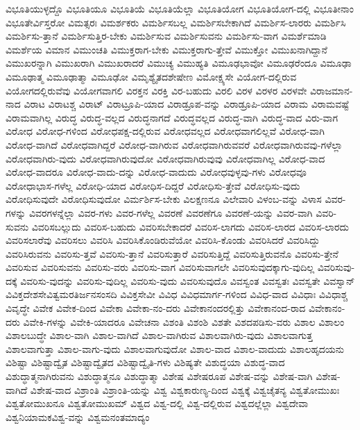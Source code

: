 {ವಿಭೂತಿಯುಳ್ಳದ್ದೊ
ವಿಭೂತಿಯೂ
ವಿಭೂತಿಯೆ
ವಿಭೂತಿಯೆಲ್ಲಾ
ವಿಭೂತಿಯೋಗ
ವಿಭೂತಿಯೋಗ-ದಲ್ಲಿ
ವಿಭೂತೀನಾಂ
ವಿಭೂತೇರ್ವಿಸ್ತರೋ
ವಿಮತ್ಸರಃ
ವಿಮರ್ಶಕರು
ವಿಮರ್ಶಿಸಬಲ್ಲ
ವಿಮರ್ಶಿಸಬೇಕಾಗಿದೆ
ವಿಮರ್ಶಿಸ-ಲಾರರು
ವಿಮರ್ಶಿಸಿ
ವಿಮರ್ಶಿಸು-ತ್ತಾನೆ
ವಿಮರ್ಶಿಸುತ್ತಿರ-ಬೇಕು
ವಿಮರ್ಶಿಸುವ
ವಿಮರ್ಶಿಸುವನು
ವಿಮರ್ಶಿಸು-ವಾಗ
ವಿಮರ್ಶೆಮಾಡಿ
ವಿಮರ್ಶೆಯ
ವಿಮಾನ
ವಿಮುಂಚತಿ
ವಿಮುಕ್ತರಾಗ-ಬೇಕು
ವಿಮುಕ್ತರಾಗು-ತ್ತೇವೆ
ವಿಮುಕ್ತೋ
ವಿಮುಖನಾಗಿದ್ದಾನೆ
ವಿಮುಖರನ್ನಾಗಿ
ವಿಮುಖರಾಗಿ
ವಿಮುಖರಾದರೆ
ವಿಮುಚ್ಯ
ವಿಮುಹ್ಯತಿ
ವಿಮೂಢಭಾವೋ
ವಿಮೂಢರೆಂದೂ
ವಿಮೂಢಾ
ವಿಮೂಢಾತ್ಮ
ವಿಮೂಢಾತ್ಮಾ
ವಿಮೂಢೋ
ವಿಮೃಶ್ಯೈತದಶೇಷೇಣ
ವಿಮೋಕ್ಷ್ಯಸೇ
ವಿಯೋಗ-ದಲ್ಲಿರುವ
ವಿಯೋಗದಲ್ಲಿರುವೆವು
ವಿಯೋಗವಾಗಲಿ
ವಿರಕ್ತನ
ವಿರಕ್ತಿ
ವಿರ-ಬಹುದು
ವಿರಲಿ
ವಿರಳ
ವಿರಳರ
ವಿರಳವೇ
ವಿರಾಜಮಾನ-ನಾದ
ವಿರಾಟ
ವಿರಾಟಶ್ಚ
ವಿರಾಟ್
ವಿರಾಟ್ರೂಪಿ-ಯಾದ
ವಿರಾಡ್ರೂಪ-ವನ್ನು
ವಿರಾಡ್ರೂಪಿ-ಯಾದ
ವಿರಾಮ
ವಿರಾಮವಷ್ಟೆ
ವಿರಾಮವಾಗಿಲ್ಲ
ವಿರುದ್ಧ
ವಿರುದ್ಧ-ವಲ್ಲದ
ವಿರುದ್ಧನಾಗದೆ
ವಿರುದ್ಧವಲ್ಲದ
ವಿರುದ್ಧ-ವಾಗಿ
ವಿರುದ್ಧ-ವಾದ
ವಿರು-ವಾಗ
ವಿರೋಧ
ವಿರೋಧ-ಗಳಿಂದ
ವಿರೋಧಪಕ್ಷ-ದಲ್ಲಿರುವ
ವಿರೋಧವಲ್ಲದ
ವಿರೋಧವಾಗಲಿಲ್ಲವೆ
ವಿರೋಧ-ವಾಗಿ
ವಿರೋಧ-ವಾಗಿದೆ
ವಿರೋಧವಾಗಿದ್ದರೆ
ವಿರೋಧ-ವಾಗಿರುವ
ವಿರೋಧವಾಗಿರುವವರೆ
ವಿರೋಧವಾಗಿರುವವು-ಗಳೆಲ್ಲಾ
ವಿರೋಧವಾಗಿರು-ವುದು
ವಿರೋಧವಾಗಿರುವುದೋ
ವಿರೋಧವಾಗಿರುವುವು
ವಿರೋಧವಾಗಿಲ್ಲ
ವಿರೋಧ-ವಾದ
ವಿರೋಧ-ವಾದರೂ
ವಿರೋಧ-ವಾದು-ದನ್ನು
ವಿರೋಧ-ವಾದುದು
ವಿರೋಧವುಳ್ಳವು-ಗಳು
ವಿರೋಧವೂ
ವಿರೋಧಾಭಾಸ-ಗಳೆಲ್ಲ
ವಿರೋಧಿ-ಯಾದ
ವಿರೋಧಿಸ-ದಿದ್ದರೆ
ವಿರೋಧಿಸು-ತ್ತೇವೆ
ವಿರೋಧಿಸು-ವುದು
ವಿರೋಧಿಸುವುದೇ
ವಿರೋಧಿಸುವುದೋ
ವಿರ್ಮರ್ಶಿಸ-ಬೇಕು
ವಿಲಕ್ಷಣನೂ
ವಿಲೇವಾರಿ
ವಿಳಂಬ-ವನ್ನು
ವಿಳಾಸ
ವಿವರ-ಗಳನ್ನು
ವಿವರಗಳನ್ನೆಲ್ಲಾ
ವಿವರ-ಗಳು
ವಿವರ-ಗಳೆಲ್ಲ
ವಿವರಣೆ
ವಿವರಣೆಗೂ
ವಿವರಣೆ-ಯನ್ನು
ವಿವರ-ವಾಗಿ
ವಿವರಿ-ಸುವನು
ವಿವರಿಸಬಲ್ಲುದು
ವಿವರಿಸ-ಬಹುದು
ವಿವರಿಸಬೇಕಾದರೆ
ವಿವರಿಸ-ಲಾಗದು
ವಿವರಿಸ-ಲಾರದ
ವಿವರಿಸ-ಲಾರದು
ವಿವರಿಸಲಾರೆವು
ವಿವರಿಸಲು
ವಿವರಿಸಿ
ವಿವರಿಸಿಕೊಂಡಿರುವೆಯೋ
ವಿವರಿಸಿ-ಕೊಂಡು
ವಿವರಿಸಿದರೆ
ವಿವರಿಸಿದ್ದು
ವಿವರಿಸಿರುವನು
ವಿವರಿಸು-ತ್ತವೆ
ವಿವರಿಸು-ತ್ತಾನೆ
ವಿವರಿಸುತ್ತಾರೆ
ವಿವರಿಸುತ್ತಿದ್ದೆ
ವಿವರಿಸುತ್ತಿರುವನೊ
ವಿವರಿಸು-ತ್ತೇನೆ
ವಿವರಿಸುವ
ವಿವರಿಸುವನು
ವಿವರಿಸು-ವರು
ವಿವರಿಸು-ವಾಗ
ವಿವರಿಸುವಾಗಲೇ
ವಿವರಿಸುವುದಕ್ಕಾಗು-ವುದಿಲ್ಲ
ವಿವರಿಸುವು-ದಕ್ಕೆ
ವಿವರಿಸು-ವುದನ್ನು
ವಿವರಿಸು-ವುದಿಲ್ಲ
ವಿವರಿಸು-ವುದು
ವಿವರಿಸುವುದೊ
ವಿವಸ್ವಂತ
ವಿವಸ್ವತಃ
ವಿವಸ್ವತೇ
ವಿವಸ್ವಾನ್
ವಿವಿಕ್ತದೇಶಸೇವಿತ್ವಮರತಿರ್ಜನಸಂಸದಿ
ವಿವಿಕ್ತಸೇವೀ
ವಿವಿಧ
ವಿವಿಧಮಾರ್ಗ-ಗಳಿಂದ
ವಿವಿಧ-ವಾದ
ವಿವಿಧಾಃ
ವಿವಿಧಾಶ್ಚ
ವಿವೃದ್ಧೇ
ವಿವೇಕ
ವಿವೇಕ-ದಿಂದ
ವಿವೇಕಾ
ವಿವೇಕಾ-ನಂ-ದರು
ವಿವೇಕಾನಂದರಲ್ಲಿತ್ತು
ವಿವೇಕಾನಂದ-ರಾದ
ವಿವೇಕಾನಂ-ದರು
ವಿವೇಕಿ-ಗಳನ್ನು
ವಿವೇಕಿ-ಯಾದರೂ
ವಿವೇಚನಾ
ವಿಶಂತಿ
ವಿಶಂಶಿ
ವಿಶತೇ
ವಿಶದಪಡಿಸು-ವರು
ವಿಶಾಲ
ವಿಶಾಲಂ
ವಿಶಾಲಬುದ್ಧೇ
ವಿಶಾಲ-ವಾಗಿ
ವಿಶಾಲ-ವಾಗಿದೆ
ವಿಶಾಲ-ವಾಗಿರುವ
ವಿಶಾಲವಾಗಿರು-ವುದು
ವಿಶಾಲವಾಗುತ್ತ
ವಿಶಾಲವಾಗುತ್ತಾ
ವಿಶಾಲ-ವಾಗು-ವುದು
ವಿಶಾಲವಾಗುವುದೋ
ವಿಶಾಲ-ವಾದ
ವಿಶಾಲ-ವಾದುದು
ವಿಶಾಲಹೃದಯನು
ವಿಶಿಷ್ಟಾ
ವಿಶಿಷ್ಟಾದ್ವೈತ
ವಿಶಿಷ್ಟಾದ್ವೈತದ
ವಿಶಿಷ್ಟಾದ್ವೈತಿ-ಗಳು
ವಿಶಿಷ್ಯತೇ
ವಿಶುದ್ಧಯಾ
ವಿಶುದ್ಧ-ವಾದ
ವಿಶುದ್ಧಾತ್ಮನಾಗಿರುವನು
ವಿಶುದ್ಧಾತ್ಮನೂ
ವಿಶುದ್ಧಾತ್ಮಾ
ವಿಶೇಷ
ವಿಶೇಷರೂಪ
ವಿಶೇಷ-ವನ್ನು
ವಿಶೇಷ-ವಾಗಿ
ವಿಶೇಷ-ವಾಗಿದೆ
ವಿಶೇಷ-ವಾದ
ವಿಶ್ರಾಂತಿ
ವಿಶ್ರಾಂತಿ-ಯನ್ನು
ವಿಶ್ವ
ವಿಶ್ವಕಾರುಣ್ಯ-ದಿಂದ
ವಿಶ್ವಕ್ಕೆ
ವಿಶ್ವಚೈತನ್ಯ
ವಿಶ್ವತೋಮುಖಃ
ವಿಶ್ವತೋಮುಖನೂ
ವಿಶ್ವತೋಮುಖಮ್
ವಿಶ್ವದ
ವಿಶ್ವ-ದಲ್ಲಿ
ವಿಶ್ವ-ದಲ್ಲಿರುವ
ವಿಶ್ವದಲ್ಲೆಲ್ಲಾ
ವಿಶ್ವದೇವಾ
ವಿಶ್ವನಿಯಾಮಕವಿಶ್ವ-ವನ್ನು
ವಿಶ್ವಮನಂತಮಾದ್ಯಂ
}
